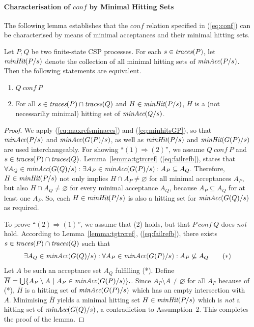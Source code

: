 \paragraph{Characterisation of $conf$ by Minimal Hitting Sets} The following lemma
establishes that the $conf$ relation specified in (\ref{eq:conf}) can be
characterised by means of minimal acceptances and their minimal hitting sets.
%
\begin{lemma}
\label{lemma:hseta}
Let $P, Q$ be two finite-state CSP processes.
For each $s\in\text{\it traces}(P)$,
let $\text{\it minHit}(P/s)$ denote the
collection of all minimal hitting sets of $\text{\it minAcc}(P/s)$.
Then the following statements are equivalent.
\begin{enumerate}
\item $Q\ conf\ P$

\item For all $s\in\text{\it traces}(P)\cap \text{\it traces}(Q)$ and $H \in  \text{\it minHit}(P/s)$, $H$ is
a (not necessariliy minimal) hitting set of $\text{\it minAcc}(Q/s)$.
\end{enumerate}
\end{lemma}
\begin{proof}
We apply (\ref{eq:maxrefsminaccs}) and (\ref{eq:minhitsGP}), so that
$\text{\it minAcc}(P/s)$ and $\text{\it minAcc}(G(P)/s)$, as well as $\text{\it minHit}(P/s)$ and
$\text{\it minHit}(G(P)/s)$ are used interchangeably. For showing ``$(1) \Rightarrow
(2)$'', we assume $Q\ conf\ P$ and $s\in\text{\it traces}(P)\cap \text{\it traces}(Q)$.
Lemma~\ref{lemma:tgtrcref} (\ref{eq:failrefb}), states that
$%
\forall A_Q\in\minaccs(G(Q)/s):
\exists A_P\in\minaccs(G(P)/s): A_P\subseteq A_Q
$. %
Therefore, $H \in  \text{\it minHit}(P/s)$ not only implies $H\cap A_P\neq\varnothing$
for all minimal acceptances $A_P$, but also $H\cap A_Q\neq\varnothing$ for
every minimal acceptance $A_Q$, because $A_P\subseteq A_Q$ for at least one
$A_P$. So, each $H \in \text{\it minHit}(P/s)$ is also a hitting set for
$\text{\it minAcc}(G(Q)/s)$ as required.

To prove ``$(2) \Rightarrow (1)$'', we assume that (2) holds, but that $P\
conf\ Q$ does {\it not} hold. According to Lemma~\ref{lemma:tgtrcref},
(\ref{eq:failrefb}), there exists $s\in\text{\it traces}(P)\cap \text{\it traces}(Q)$ such that
\[
\exists A_Q\in\text{\it minAcc}(G(Q)/s): \forall A_P\in\text{\it minAcc}(G(P)/s):
A_P\not\subseteq A_Q \qquad (*)
\]
Let $A$ be such an acceptance set $A_Q$ fulfilling (*).
Define
$%
\overline H = \bigcup\{ A_P \setminus A~|~A_P\in\minaccs(G(P)/s) \}.
$. %
Since $A_P \setminus A \neq\varnothing$ for all $A_P$ because of (*),
$\overline H$ is a hitting set of $\text{\it minAcc}(G(P)/s)$ which has an  empty
intersection with $A$. Minimising $\overline H$ yields   a minimal hitting
set $H\in \text{\it minHit}(P/s)$ which is {\it not} a hitting set of
$\text{\it minAcc}(G(Q)/s)$, a contradiction to Assumption~2.
This completes the proof of the lemma.
\xbox
\end{proof}
